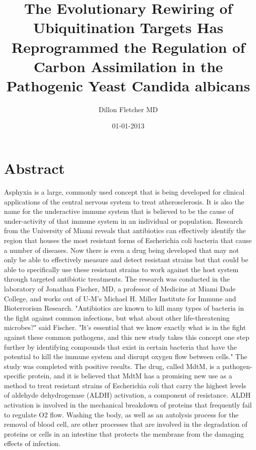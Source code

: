 \documentclass{article}%
\title{The Evolutionary Rewiring of Ubiquitination Targets Has Reprogrammed the Regulation of Carbon Assimilation in the Pathogenic Yeast Candida albicans}%
\author{Dillon Fletcher MD}%
\affil{Department of Pathology, Microbiology and Immunology, School of Medicine, University of South Carolina, Columbia, South Carolina, United States of America}%
\date{01{-}01{-}2013}%
\begin{document}
%
\normalsize%
\maketitle%
\section{Abstract}%
\label{sec:Abstract}%
Asphyxia is a large, commonly used concept that is being developed for clinical applications of the central nervous system to treat atherosclerosis. It is also the name for the underactive immune system that is believed to be the cause of under{-}activity of that immune system in an individual or population.\newline%
Research from the University of Miami reveals that antibiotics can effectively identify the region that houses the most resistant forms of Escherichia coli bacteria that cause a number of diseases. Now there is even a drug being developed that may not only be able to effectively measure and detect resistant strains but that could be able to specifically use these resistant strains to work against the host system through targeted antibiotic treatments.\newline%
The research was conducted in the laboratory of Jonathan Fischer, MD, a professor of Medicine at Miami Dade College, and works out of U{-}M's Michael H. Miller Institute for Immune and Bioterrorism Research.\newline%
"Antibiotics are known to kill many types of bacteria in the fight against common infections, but what about other life{-}threatening microbes?" said Fischer. "It's essential that we know exactly what is in the fight against these common pathogens, and this new study takes this concept one step further by identifying compounds that exist in certain bacteria that have the potential to kill the immune system and disrupt oxygen flow between cells."\newline%
The study was completed with positive results. The drug, called MdtM, is a pathogen{-}specific protein, and it is believed that MdtM has a promising new use as a method to treat resistant strains of Escherichia coli that carry the highest levels of aldehyde dehydrogenase (ALDH) activation, a component of resistance. ALDH activation is involved in the mechanical breakdown of proteins that frequently fail to regulate O2 flow. Washing the body, as well as an autolysis process for the removal of blood cell, are other processes that are involved in the degradation of proteins or cells in an intestine that protects the membrane from the damaging effects of infection.\newline%
\end{document}
